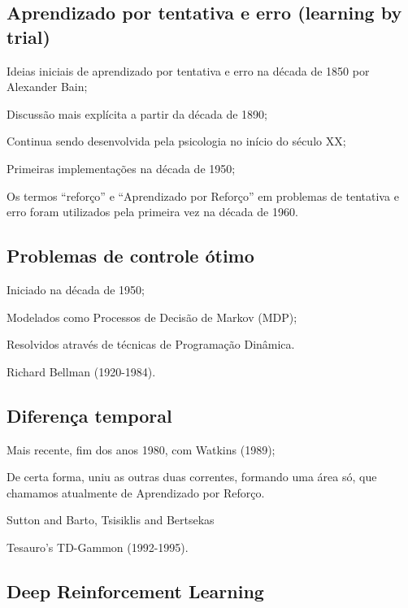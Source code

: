 \documentclass{article}
\begin{document}
        \subsection{Aprendizado por tentativa e erro (learning by trial)}
        
            Ideias iniciais de aprendizado por tentativa e erro na década de 1850 por Alexander Bain;
            
            Discussão mais explícita a partir da década de 1890;
            
            Continua sendo desenvolvida pela psicologia no início do século XX;
            
            Primeiras implementações na década de 1950;
            
            Os termos “reforço” e “Aprendizado por Reforço” em problemas de tentativa e erro foram utilizados pela primeira vez na década de 1960.
        
        \subsection{Problemas de controle ótimo}
        
            Iniciado na década de 1950;
            
            Modelados como Processos de Decisão de Markov (MDP);
            
            Resolvidos através de técnicas de Programação Dinâmica.
            
            Richard Bellman (1920-1984).
            
        \subsection{Diferença temporal}
        
            Mais recente, fim dos anos 1980, com Watkins (1989);
            
            De certa forma, uniu as outras duas correntes, formando uma área só, que chamamos atualmente de Aprendizado por Reforço.
            
            Sutton and Barto, Tsisiklis and Bertsekas
            
            Tesauro's TD-Gammon (1992-1995).
        
        \subsection{Deep Reinforcement Learning}
        
\end{document}
